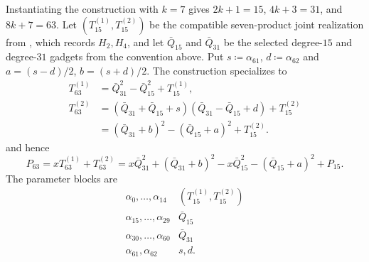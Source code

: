 \begin{example}[Worked example: $k=7$ (constructing $63$)]
    Instantiating the construction with $k=7$ gives $2k+1=15$, $4k+3=31$, and $8k+7=63$.
    Let $(T^{(1)}_{15},T^{(2)}_{15})$ be the compatible seven-product joint
    realization from , which records $H_2,H_4$, and
    let $\bar Q_{15}$ and
    $\bar Q_{31}$ be the selected degree-$15$ and degree-$31$ gadgets from
    the convention above.
    Put $s\coloneqq\alpha_{61}$, $d\coloneqq\alpha_{62}$ and
    $a=(s-d)/2$, $b=(s+d)/2$.  The construction specializes to
    \[
      \begin{aligned}
        T^{(1)}_{63}
          &=\bar Q_{31}^2-\bar Q_{15}^2+T^{(1)}_{15},\\
        T^{(2)}_{63}
          &=(\bar Q_{31}+\bar Q_{15}+s)
            (\bar Q_{31}-\bar Q_{15}+d)+T^{(2)}_{15}\\
          &=(\bar Q_{31}+b)^2-(\bar Q_{15}+a)^2+T^{(2)}_{15}.
      \end{aligned}
    \]
    and hence
    \[
        P_{63}=xT^{(1)}_{63}+T^{(2)}_{63}
        = x\bar Q_{31}^2 + (\bar Q_{31}+b)^2
          -x\bar Q_{15}^2-(\bar Q_{15}+a)^2+P_{15}.
    \]
    The parameter blocks are
    \[
      \begin{array}{c|c}
        \alpha_0,\ldots,\alpha_{14}&(T^{(1)}_{15},T^{(2)}_{15})\\
        \alpha_{15},\ldots,\alpha_{29}&\bar Q_{15}\\
        \alpha_{30},\ldots,\alpha_{60}&\bar Q_{31}\\
        \alpha_{61},\alpha_{62}&s,d.
      \end{array}
    \]
\end{example}

